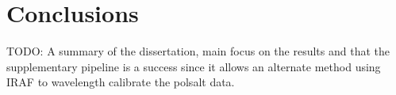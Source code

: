 \chapter{Conclusions}

TODO: A summary of the dissertation, main focus on the results and that the supplementary pipeline is a success since it allows an alternate method using IRAF to wavelength calibrate the polsalt data.